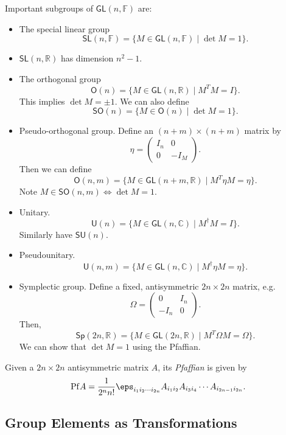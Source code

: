 \documentclass[12pt]{article}
\begin{document}
Important subgroups of $\mathsf{GL}(n, \mathbb{F})$ are:
\begin{itemize}
	\item The special linear group
		\[
			\mathsf{SL}(n, \mathbb{F}) = \{M \in \mathsf{GL}(n, \mathbb{F}) \mid \det M = 1\}.
		\]
	\item $\mathsf{SL}(n, \mathbb{R})$ has dimension $n^2 - 1$.
	\item The orthogonal group
		\[
			\mathsf O(n) = \{M \in \mathsf{GL}(n, \mathbb{R}) \mid M^T M = I\}.
		\]
		This implies $\det M = \pm 1$. We can also define
		\[
			\mathsf{SO}(n) = \{M \in \mathsf O(n) \mid \det M = 1\}.
		\]
	\item Pseudo-orthogonal group. Define an $(n + m) \times (n + m)$ matrix by
		\[
		\eta =
		\begin{pmatrix}
			I_n & 0 \\
			0 & -I_M
		\end{pmatrix}.
		\]
		Then we can define
		\[
			\mathsf{O}(n, m) = \{M \in \mathsf{GL}(n + m, \mathbb{R}) \mid M^T \eta M = \eta\}.
		\]
		Note $M \in \mathsf{SO}(n, m) \iff \det M = 1$.
	\item Unitary.
		\[
			\mathsf{U}(n) = \{ M \in \mathsf{GL}(n, \mathbb{C}) \mid M^{\dagger} M = I\}.
		\]
		Similarly have $\mathsf{SU}(n)$.
	\item Pseudounitary.
		\[
			\mathsf{U}(n, m) = \{M \in \mathsf{GL}(n, \mathbb{C}) \mid M^{\dagger} \eta M = \eta\}.
		\]
	\item Symplectic group. Define a fixed, antisymmetric $2n \times 2n$ matrix, e.g.
		\[
		\Omega =
		\begin{pmatrix}
			0 & I_n \\
			-I_n & 0
		\end{pmatrix}.
		\]
		Then,
		\[
			\mathsf{Sp}(2n, \mathbb{R}) = \{M \in \mathsf{GL}(2n, \mathbb{R}) \mid M^{T} \Omega M = \Omega\}.
		\]
		We can show that $\det M = 1$ using the Pfaffian.
\end{itemize}

\begin{definition}
	Given a $2n \times 2n$ antisymmetric matrix $A$, its \emph{Pfaffian} is given by
	\[
	\mathrm{Pf} A = \frac{1}{2^n n!} \eps_{i_1 i_2 \cdots i_{2n}} A_{i_1 i_2} A_{i_3 i_4} \cdots A_{i_{2n-1} i_{2n}}.
	\]
\end{definition}

\subsection{Group Elements as Transformations}%
\label{sub:ge_t}
\end{document}
